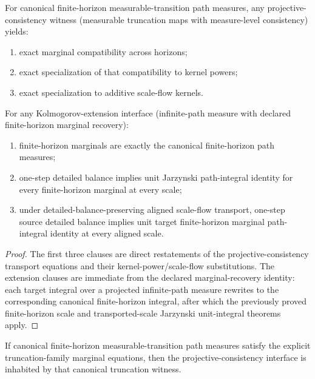 \begin{theorem}\label{thm:measurable-transition-projective-kolmogorov-endpoint}
For canonical finite-horizon measurable-transition path measures, any projective-consistency witness (measurable truncation maps with measure-level consistency) yields:
\begin{enumerate}
\item exact marginal compatibility across horizons;
\item exact specialization of that compatibility to kernel powers;
\item exact specialization to additive scale-flow kernels.
\end{enumerate}

For any Kolmogorov-extension interface (infinite-path measure with declared finite-horizon marginal recovery):
\begin{enumerate}
\item finite-horizon marginals are exactly the canonical finite-horizon path measures;
\item one-step detailed balance implies unit Jarzynski path-integral identity for every finite-horizon marginal at every scale;
\item under detailed-balance-preserving aligned scale-flow transport, one-step source detailed balance implies unit target finite-horizon marginal path-integral identity at every aligned scale.
\end{enumerate}
\end{theorem}

\begin{proof}
The first three clauses are direct restatements of the projective-consistency transport equations and their kernel-power/scale-flow substitutions. The extension clauses are immediate from the declared marginal-recovery identity: each target integral over a projected infinite-path measure rewrites to the corresponding canonical finite-horizon integral, after which the previously proved finite-horizon scale and transported-scale Jarzynski unit-integral theorems apply.
\end{proof}

\begin{theorem}\label{thm:measurable-transition-projective-canonical-instance}
If canonical finite-horizon measurable-transition path measures satisfy the explicit truncation-family marginal equations, then the projective-consistency interface is inhabited by that canonical truncation witness.
\end{theorem}

